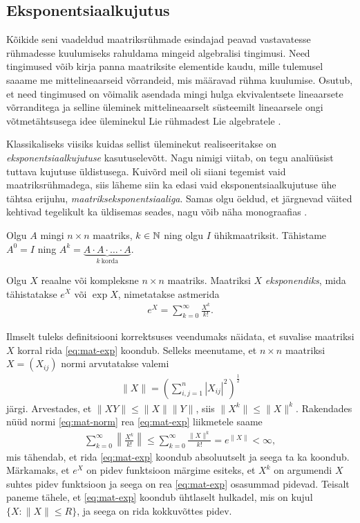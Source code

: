 \subsection{Eksponentsiaalkujutus}

Kõikide seni vaadeldud maatriksrühmade esindajad peavad
vastavatesse rühmadesse kuulumiseks rahuldama mingeid algebralisi tingimusi.
Need tingimused võib kirja panna maatriksite elementide kaudu, mille
tulemusel saaame me mittelineaarseid võrrandeid, mis määravad rühma kuulumise.
Osutub, et need tingimused on võimalik asendada mingi hulga ekvivalentsete
lineaarsete võrranditega ja selline üleminek mittelineaarselt süsteemilt
lineaarsele ongi võtmetähtsusega idee üleminekul Lie rühmadest Lie
algebratele \cite{johan1989survey}.

Klassikaliseks viisiks kuidas sellist üleminekut realiseeritakse on
\emph{eksponentsiaalkujutuse} kasutuselevõtt. Nagu nimigi viitab, on
tegu analüüsist tuttava kujutuse üldistusega. Kuivõrd meil oli
siiani tegemist vaid maatriksrühmadega, siis läheme siin ka edasi
vaid eksponentsiaalkujutuse
ühe tähtsa erijuhu, \emph{maatrikseksponentsiaaliga}. Samas olgu öeldud,
et järgnevad väited kehtivad tegelikult ka üldisemas seades,
nagu võib näha monograafias \cite{kirillov2008introduction}.

Olgu $A$ mingi $n \times n$ maatriks, $k \in \mathbb{N}$ ning olgu $I$
ühikmaatriksit. Tähistame $A^0 = I$ ning
$A^k = \underbrace{A \cdot A \cdot \ldots \cdot A}_{k\ \text{korda}}$.

\begin{dfn}
    Olgu $X$ reaalne või kompleksne $n \times n$ maatriks. Maatriksi
    $X$ \emph{eksponendiks}, mida tähistatakse $e^X$ või $\exp X$, nimetatakse
    astmerida
    \begin{align}\label{eq:mat-exp}
        e^X = \sum_{k=0}^{\infty} \frac{X^k}{k!}.
    \end{align}
\end{dfn}

Ilmselt tuleks definitsiooni korrektsuses veendumaks näidata, et suvalise
maatriksi $X$ korral rida \eqref{eq:mat-exp} koondub. Selleks meenutame,
et $n \times n$ maatriksi $X = (X_{ij})$ normi arvutatakse valemi
\begin{align}\label{eq:mat-norm}
    \| X \| = \left( \sum_{i,j=1}^n |X_{ij}|^2 \right)^{\frac{1}{2}}
\end{align}
järgi. Arvestades, et $\| XY \| \le \|X\| \|Y\|$, siis $\|X^k\| \le \|X\|^k$.
Rakendades nüüd normi \eqref{eq:mat-norm} rea \eqref{eq:mat-exp} liikmetele
saame
\begin{align*}
    \sum_{k=0}^\infty \left\lVert \frac{X^k}{k!} \right\rVert \le
    \sum_{k=0}^\infty \frac{\|X\|^k}{k!} = e^{\|X\|} < \infty,
\end{align*}
mis tähendab, et rida \eqref{eq:mat-exp} koondub absoluutselt ja seega
ta ka koondub. Märkamaks, et $e^X$ on pidev funktsioon märgime esiteks,
et $X^k$ on argumendi $X$ suhtes pidev funktsioon ja seega on rea
\eqref{eq:mat-exp} osasummad pidevad. Teisalt paneme tähele, et
\eqref{eq:mat-exp} koondub ühtlaselt hulkadel, mis on kujul
$\{ X : \|X\| \le R \}$, ja seega on rida kokkuvõttes pidev.

